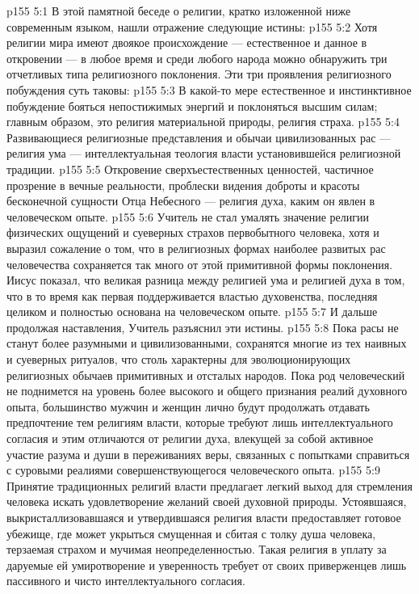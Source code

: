 \vs p155 5:1 В этой памятной беседе о религии, кратко изложенной ниже современным языком, нашли отражение следующие истины:
\vs p155 5:2 \pc Хотя религии мира имеют двоякое происхождение --- естественное и данное в откровении --- в любое время и среди любого народа можно обнаружить три отчетливых типа религиозного поклонения. Эти три проявления религиозного побуждения суть таковы:
\vs p155 5:3 \bibnobreakspace {} В какой\hyp{}то мере естественное и инстинктивное побуждение бояться непостижимых энергий и поклоняться высшим силам; главным образом, это религия материальной природы, религия страха.
\vs p155 5:4 \bibnobreakspace {} Развивающиеся религиозные представления и обычаи цивилизованных рас --- религия ума --- интеллектуальная теология власти установившейся религиозной традиции.
\vs p155 5:5 \bibnobreakspace {} Откровение сверхъестественных ценностей, частичное прозрение в вечные реальности, проблески видения доброты и красоты бесконечной сущности Отца Небесного --- религия духа, каким он явлен в человеческом опыте.
\vs p155 5:6 \pc Учитель не стал умалять значение религии физических ощущений и суеверных страхов первобытного человека, хотя и выразил сожаление о том, что в религиозных формах наиболее развитых рас человечества сохраняется так много от этой примитивной формы поклонения. Иисус показал, что великая разница между религией ума и религией духа в том, что в то время как первая поддерживается властью духовенства, последняя целиком и полностью основана на человеческом опыте.
\vs p155 5:7 \pc И дальше продолжая наставления, Учитель разъяснил эти истины.
\vs p155 5:8 \pc Пока расы не станут более разумными и цивилизованными, сохранятся многие из тех наивных и суеверных ритуалов, что столь характерны для эволюционирующих религиозных обычаев примитивных и отсталых народов. Пока род человеческий не поднимется на уровень более высокого и общего признания реалий духовного опыта, большинство мужчин и женщин лично будут продолжать отдавать предпочтение тем религиям власти, которые требуют лишь интеллектуального согласия и этим отличаются от религии духа, влекущей за собой активное участие разума и души в переживаниях веры, связанных с попытками справиться с суровыми реалиями совершенствующегося человеческого опыта.
\vs p155 5:9 Принятие традиционных религий власти предлагает легкий выход для стремления человека искать удовлетворение желаний своей духовной природы. Устоявшаяся, выкристаллизовавшаяся и утвердившаяся религия власти предоставляет готовое убежище, где может укрыться смущенная и сбитая с толку душа человека, терзаемая страхом и мучимая неопределенностью. Такая религия в уплату за даруемые ей умиротворение и уверенность требует от своих приверженцев лишь пассивного и чисто интеллектуального согласия.
